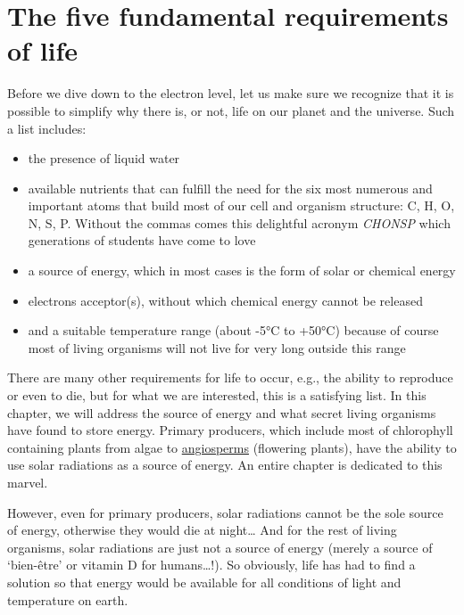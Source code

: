 \documentclass[]{book}
\providecommand{\tightlist}{%
  \setlength{\itemsep}{0pt}\setlength{\parskip}{0pt}}
\theoremstyle{definition}
\theoremstyle{definition}
\theoremstyle{definition}
\theoremstyle{remark}
\begin{document}
\section{The five fundamental requirements of
life}\label{the-five-fundamental-requirements-of-life}

Before we dive down to the electron level, let us make sure we recognize
that it is possible to simplify why there is, or not, life on our planet
and the universe. Such a list includes:

\begin{itemize}
\tightlist
\item
  the presence of liquid water
\item
  available nutrients that can fulfill the need for the six most
  numerous and important atoms that build most of our cell and organism
  structure: C, H, O, N, S, P. Without the commas comes this delightful
  acronym \emph{CHONSP} which generations of students have come to love
\item
  a source of energy, which in most cases is the form of solar or
  chemical energy
\item
  electrons acceptor(s), without which chemical energy cannot be
  released
\item
  and a suitable temperature range (about -5°C to +50°C) because of
  course most of living organisms will not live for very long outside
  this range
\end{itemize}

There are many other requirements for life to occur, e.g., the ability
to reproduce or even to die, but for what we are interested, this is a
satisfying list. In this chapter, we will address the source of energy
and what secret living organisms have found to store energy. Primary
producers, which include most of chlorophyll containing plants from
algae to
\href{https://en.wikipedia.org/wiki/Flowering_plant}{angiosperms}
(flowering plants), have the ability to use solar radiations as a source
of energy. An entire chapter is dedicated to this marvel.

However, even for primary producers, solar radiations cannot be the sole
source of energy, otherwise they would die at night\ldots{} And for the
rest of living organisms, solar radiations are just not a source of
energy (merely a source of `bien-être' or vitamin D for
humans\ldots{}!). So obviously, life has had to find a solution so that
energy would be available for all conditions of light and temperature on
earth.
\end{document}
